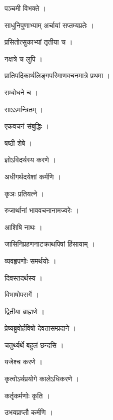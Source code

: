 \documentclass[10pt, openany]{book}
\begin{document}
\noindent पञ्चमी विभक्ते ।

\noindent साधुनिपुणाभ्याम् अर्चायां सप्तम्यप्रतेः ।

\noindent प्रसितोत्सुकाभ्यां तृतीया च ।

\noindent नक्षत्रे च लुपि ।

\noindent प्रातिपदिकार्थलिङ्गपरिमाणवचनमात्रे प्रथमा ।

\noindent सम्बोधने च ।

\noindent साऽऽमन्त्रितम् ।

\noindent एकवचनं संबुद्धिः ।

\noindent षष्ठी शेषे ।

\noindent ज्ञोऽविदर्थस्य करणे ।

\noindent अधीगर्थदयेशां कर्मणि ।

\noindent कृञः प्रतियत्ने ।

\noindent रुजार्थानां भाववचनानामज्वरेः ।

\noindent आशिषि नाथः ।

\noindent जासिनिप्रहणनाटक्राथपिषां हिंसायाम् ।

\noindent व्यवहृपणोः समर्थयोः ।

\noindent दिवस्तदर्थस्य ।

\noindent विभाषोपसर्गे ।

\noindent द्वितीया ब्राह्मणे ।

\noindent प्रेष्यब्रुवोर्हविषो देवतासम्प्रदाने ।

\noindent चतुर्थ्यर्थे बहुलं छन्दसि ।

\noindent यजेश्च करणे ।

\noindent कृत्वोऽर्थप्रयोगे कालेऽधिकरणे ।

\noindent कर्तृकर्मणोः कृति ।

\noindent उभयप्राप्तौ कर्मणि ।
\end{document}
